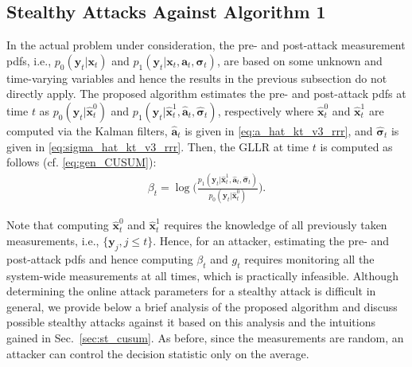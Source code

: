 \documentclass[onecolumn]{IEEEtran}
\begin{document}
\subsection{Stealthy Attacks Against Algorithm 1} \label{sec:st_proposed}

In the actual problem under consideration, the pre- and post-attack measurement pdfs, i.e., $p_0(\mathbf{y}_t|\mathbf{x}_t)$ and $p_1(\mathbf{y}_t|\mathbf{x}_t, \mathbf{a}_t, \pmb{\sigma}_t)$, are based on some unknown and time-varying variables and hence the results in the previous subsection do not directly apply. The proposed algorithm estimates the pre- and post-attack pdfs at time $t$ as $p_0(\mathbf{y}_t|\hat{\mathbf{x}}_t^0)$ and $p_1(\mathbf{y}_t|\hat{\mathbf{x}}_t^1, \hat{\mathbf{a}}_t, \hat{\pmb{\sigma}}_t)$, respectively where $\hat{\mathbf{x}}_t^0$ and $\hat{\mathbf{x}}_t^1$ are computed via the Kalman filters, $\hat{\mathbf{a}}_t$ is given in \eqref{eq:a_hat_kt_v3_rrr}, and $\hat{\pmb{\sigma}}_t$ is given in \eqref{eq:sigma_hat_kt_v3_rrr}. Then, the GLLR at time $t$ is computed as follows (cf. \eqref{eq:gen_CUSUM}):
\begin{gather}\label{eq:gllr}
\beta_t = \log\Big(\frac{p_1(\mathbf{y}_t|\hat{\mathbf{x}}_t^1, \hat{\mathbf{a}}_t, \hat{\pmb{\sigma}}_t)}{p_0(\mathbf{y}_t|\hat{\mathbf{x}}_t^0)}\Big).
\end{gather}

Note that computing $\hat{\mathbf{x}}_t^0$ and $\hat{\mathbf{x}}_t^1$ requires the knowledge of all previously taken measurements, i.e., $\{\mathbf{y}_j, j \leq t\}$. Hence, for an attacker, estimating the pre- and post-attack pdfs and hence computing $\beta_t$ and $g_t$ requires monitoring all the system-wide measurements at all times, which is practically infeasible. Although determining the online attack parameters for a stealthy attack is difficult in general, we provide below a brief analysis of the proposed algorithm and discuss possible stealthy attacks against it based on this analysis and the intuitions gained in Sec.~\ref{sec:st_cusum}. As before, since the measurements are random, an attacker can control the decision statistic only on the average.
\end{document}
